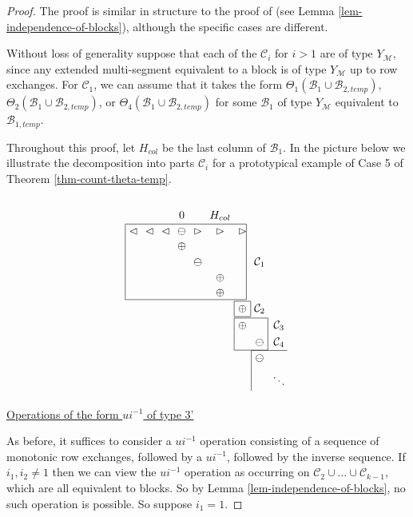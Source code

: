 \documentclass[11pt,letterpaper]{amsart}
\newcommand{\inv}{^{-1}}
\newcommand{\BB}{\mathcal{B}}
\newcommand{\CC}{\mathcal{C}}
\numberwithin{equation}{section}
\begin{document}
\begin{proof}
    The proof is similar in structure to the proof of \cite[Lemma 7.12]{HKT26} (see Lemma \ref{lem-independence-of-blocks}), although the specific cases are different.
    
    Without loss of generality suppose that each of the $\CC_i$ for $i>1$ are of type $Y_\mathcal{M}$, since any extended multi-segment equivalent to a block is of type $Y_\mathcal{M}$ up to row exchanges. For $\CC_1$, we can assume that it takes the form $\Theta_1(\BB_1 \cup \BB_{2, temp})$, $\Theta_2(\BB_1 \cup \BB_{2, temp})$, or $\Theta_4(\BB_1 \cup \BB_{2, temp})$ for some $\BB_1$ of type $Y_\mathcal{M}$ equivalent to $\BB_{1, temp}$.

    Throughout this proof, let $H_{col}$ be the last column of $\BB_1$. In the picture below we illustrate the decomposition into parts $\CC_i$ for a prototypical example of Case 5 of Theorem \ref{thm-count-theta-temp}. 
    \[\begin{tikzpicture}[baseline=(current bounding box.north)]
      \matrix (m) [matrix of math nodes, nodes in empty cells] {
        & & & 0 & & {H_{col}} & & & \\
        \lhd & \lhd & \lhd & \ominus & \rhd & \rhd & \rhd & & \\
        & & & \oplus & & & & & \\
        & & & & \ominus & & & \CC_1 & \\
        & & & & & \oplus & & & \\
        & & & & & \oplus & & & \\
        & & & & & & \oplus & \CC_2 & \\
        & & & & & & \oplus & & \CC_3 \\
        & & & & & & & \ominus & \CC_4 \\
        & & & & & & & \ominus & \phantom{\oplus} \\
        & & & & & & & \phantom{\oplus} & \ddots \\
      } ;
      \draw (m-7-7.north west) rectangle (m-7-7.south east);
      \draw (m-8-7.north west) rectangle (m-9-8.south east);
      \draw (m-10-8.north west) -- (m-10-9.north east);
      \draw (m-10-8.north west) -- (m-11-8.south west);
      \draw (m-2-1.north west) rectangle (m-6-7.south east);
    \end{tikzpicture}\]
    
    \underline{Operations of the form $ui\inv$ of type 3'}

    As before, it suffices to consider a $ui\inv$ operation consisting of a sequence of monotonic row exchanges, followed by a $ui\inv$, followed by the inverse sequence. If $i_1, i_2 \neq 1$ then we can view the $ui\inv$ operation as occurring on $\CC_2 \cup \dots \cup \CC_{k-1}$, which are all equivalent to blocks. So by Lemma \ref{lem-independence-of-blocks}, no such operation is possible. So suppose $i_1 = 1$.


\end{proof}
\end{document}
